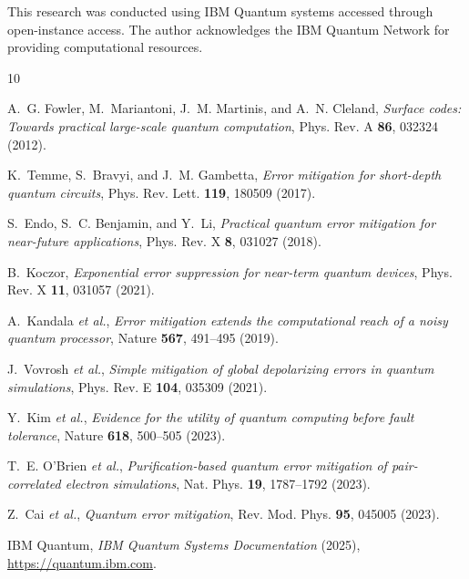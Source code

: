 \documentclass[twocolumn,preprintnumbers,amsmath,amssymb,prl]{revtex4-2}
\begin{document}
\begin{acknowledgments}
This research was conducted using IBM Quantum systems accessed through open-instance access. The author acknowledges the IBM Quantum Network for providing computational resources.
\end{acknowledgments}



\begin{thebibliography}{10}

A.~G. Fowler, M.~Mariantoni, J.~M. Martinis, and A.~N. Cleland,
\textit{Surface codes: Towards practical large-scale quantum computation},
Phys. Rev. A \textbf{86}, 032324 (2012).

K.~Temme, S.~Bravyi, and J.~M. Gambetta,
\textit{Error mitigation for short-depth quantum circuits},
Phys. Rev. Lett. \textbf{119}, 180509 (2017).

S.~Endo, S.~C. Benjamin, and Y.~Li,
\textit{Practical quantum error mitigation for near-future applications},
Phys. Rev. X \textbf{8}, 031027 (2018).

B.~Koczor,
\textit{Exponential error suppression for near-term quantum devices},
Phys. Rev. X \textbf{11}, 031057 (2021).

A.~Kandala \textit{et al.},
\textit{Error mitigation extends the computational reach of a noisy quantum processor},
Nature \textbf{567}, 491--495 (2019).

J.~Vovrosh \textit{et al.},
\textit{Simple mitigation of global depolarizing errors in quantum simulations},
Phys. Rev. E \textbf{104}, 035309 (2021).

Y.~Kim \textit{et al.},
\textit{Evidence for the utility of quantum computing before fault tolerance},
Nature \textbf{618}, 500--505 (2023).

T.~E. O'Brien \textit{et al.},
\textit{Purification-based quantum error mitigation of pair-correlated electron simulations},
Nat. Phys. \textbf{19}, 1787--1792 (2023).

Z.~Cai \textit{et al.},
\textit{Quantum error mitigation},
Rev. Mod. Phys. \textbf{95}, 045005 (2023).

IBM Quantum,
\textit{IBM Quantum Systems Documentation} (2025),
\url{https://quantum.ibm.com}.

\end{thebibliography}
\end{document}
